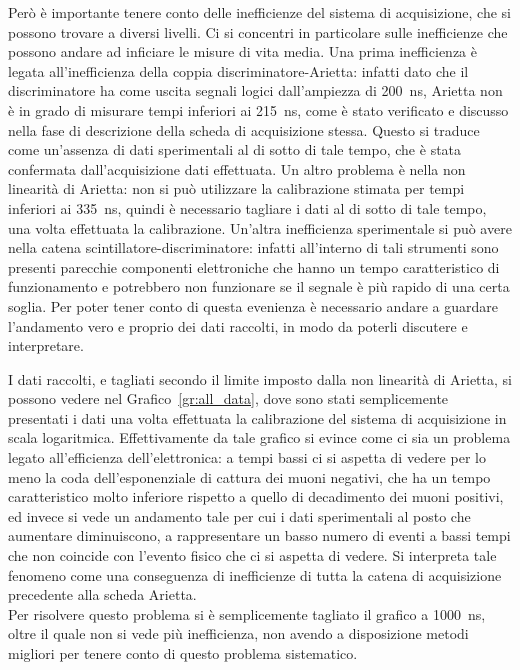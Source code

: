 Però è importante tenere conto delle inefficienze del sistema di acquisizione, che si possono trovare a diversi livelli. 
Ci si concentri in particolare sulle inefficienze che possono andare ad inficiare le misure di vita media. 
Una prima inefficienza è legata all'inefficienza della coppia discriminatore-Arietta: infatti dato che il discriminatore ha come uscita segnali logici dall'ampiezza di \SI{200}{\ns}, Arietta non è in grado di misurare tempi inferiori ai \SI{215}{\ns}, come è stato verificato e discusso nella fase di descrizione della scheda di acquisizione stessa. 
Questo si traduce come un'assenza di dati sperimentali al di sotto di tale tempo, che è stata confermata dall'acquisizione dati effettuata. 
Un altro problema è nella non linearità di Arietta: non si può utilizzare la calibrazione stimata per tempi inferiori ai \SI{335}{\ns}, quindi è necessario tagliare i dati al di sotto di tale tempo, una volta effettuata la calibrazione. 
Un'altra inefficienza sperimentale si può avere nella catena scintillatore-discriminatore: infatti all'interno di tali strumenti sono presenti parecchie componenti elettroniche che hanno un tempo caratteristico di funzionamento e potrebbero non funzionare se il segnale è più rapido di una certa soglia. 
Per poter tener conto di questa evenienza è necessario andare a guardare l'andamento vero e proprio dei dati raccolti, in  modo da poterli discutere e interpretare.\\

I dati raccolti, e tagliati secondo il limite imposto dalla non linearità di Arietta, si possono vedere nel Grafico~\ref{gr:all_data}, dove sono stati semplicemente presentati i dati una volta effettuata la calibrazione del sistema di acquisizione in scala logaritmica. 
Effettivamente da tale grafico si evince  come ci sia un problema legato all'efficienza dell'elettronica: a tempi bassi ci si aspetta di vedere per lo meno la coda dell'esponenziale di cattura dei muoni negativi, che ha un tempo caratteristico molto inferiore rispetto a quello di decadimento dei muoni positivi, ed invece si vede un andamento tale per cui i dati sperimentali al posto che aumentare diminuiscono, a rappresentare un basso numero di eventi a bassi tempi che non coincide con l'evento fisico che ci si aspetta di vedere. 
Si interpreta tale fenomeno come una conseguenza di inefficienze di tutta la catena di acquisizione precedente alla scheda Arietta.\\

Per risolvere questo problema si è semplicemente tagliato il grafico a \SI{1000}{\ns}, oltre il quale non si vede più inefficienza, non avendo a disposizione metodi migliori per tenere conto di questo problema sistematico.\\

